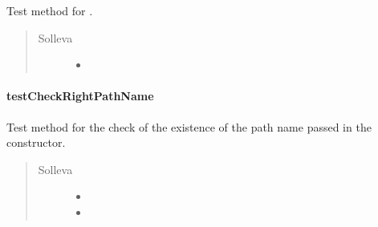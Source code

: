 \documentclass[letterpaper,10pt,italian,openany,oneside]{sphinxmanual}
\begin{document}
\begin{fulllineitems}
\label{\detokenize{test/it/unicam/cs/pa/mastermind/test/PlayersFactoryRegistry:it.unicam.cs.pa.mastermind.test.PlayersFactoryRegistry.testBreakerFactoryRegistry()}}
Test method for .
\begin{quote}\begin{description}
\item[{Solleva}] \leavevmode\begin{itemize}
\item {} 
 \textendash{} 

\end{itemize}

\end{description}\end{quote}

\end{fulllineitems}



\paragraph{testCheckRightPathName}
\label{\detokenize{test/it/unicam/cs/pa/mastermind/test/PlayersFactoryRegistry:testcheckrightpathname}}

\begin{fulllineitems}
\label{\detokenize{test/it/unicam/cs/pa/mastermind/test/PlayersFactoryRegistry:it.unicam.cs.pa.mastermind.test.PlayersFactoryRegistry.testCheckRightPathName()}}
Test method for the check of the existence of the path name passed in the constructor.
\begin{quote}\begin{description}
\item[{Solleva}] \leavevmode\begin{itemize}
\item {} 
 \textendash{} 

\item {} 
 \textendash{} 

\end{itemize}

\end{description}\end{quote}

\end{fulllineitems}
\end{document}
